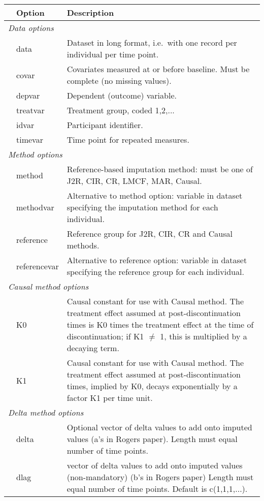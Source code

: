 \begin{tabular}{llp{.8\linewidth}}\hline
& Option & Description \\ \hline
\multicolumn{3}{l}{\em Data options} \\
& data 	&	 Dataset in long format, i.e.\ with one record per individual per time point. \\
& covar 	&	 Covariates measured at or before baseline. Must be complete (no missing values).	\\
& depvar 	&	 Dependent (outcome) variable.	\\
& treatvar 	&	 Treatment group, coded 1,2,...	\\
& idvar 	&	 Participant identifier.	\\
& timevar 	&	 Time point for repeated measures. \\

\multicolumn{3}{l}{\em Method options} \\
& method 	&	 Reference-based imputation method: must be one of J2R, CIR, CR, LMCF, MAR, Causal.	\\
& methodvar 	&	 Alternative to method option: variable in dataset specifying the imputation method  for each individual. \\
& reference 	&	 Reference group for J2R, CIR, CR and Causal methods. \\
& referencevar 	&	 Alternative to reference option: variable in dataset specifying the reference group for each individual. \\

\multicolumn{3}{l}{\em Causal method options} \\
& K0 	&	 Causal constant for use with Causal method. The treatment effect assumed at post-discontinuation times is K0 times the treatment effect at the time of discontinuation; if K1 $\ne$ 1, this is multiplied by a decaying term. \\
& K1 	&	 Causal constant for use with Causal method. The treatment effect assumed at post-discontinuation times, implied by K0, decays exponentially by a factor K1 per time unit. \\

\multicolumn{3}{l}{\em Delta method options}\\
& delta 	&	 Optional vector of delta values to add onto imputed values (a’s in Rogers paper). Length must equal number of time points.\\
& dlag 	&	 vector of delta values to add onto imputed values (non-mandatory) (b’s in Rogers paper) Length must equal number of time points. Default is c(1,1,1,...). \\


\end{tabular}
